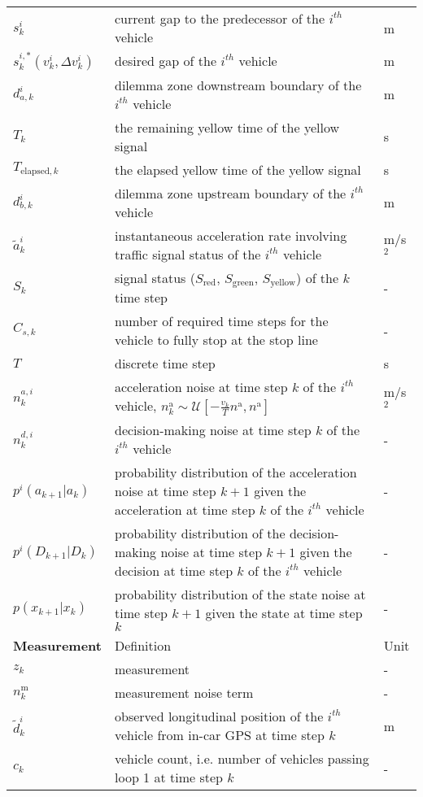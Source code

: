 \begin{longtable}{p{2.5cm}p{10cm}p{2.5cm}}
    $s_k^i$ & current gap to the predecessor of the $i^{th}$ vehicle & m \\
    $s_k^{i,*}(v_k^i, \Delta v_k^i)$ & desired gap of the $i^{th}$ vehicle & m \\
    $d_{a,k}^i$ & dilemma zone downstream boundary of the $i^{th}$ vehicle & m\\
    $T_k$ & the remaining yellow time of the yellow signal & s\\
    $T_{\text{elapsed},k}$ & the elapsed yellow time of the yellow signal & s\\
    $d_{b,k}^i$ & dilemma zone upstream boundary of the $i^{th}$ vehicle & m \\
    $\tilde a_k^i$  & instantaneous acceleration rate involving traffic signal status of the $i^{th}$ vehicle & m/s$^2$ \\
    $S_{k}$ & signal status ($S_{\text{red}}$, $S_{\text{green}}$, $S_{\text{yellow}}$) of the $k$ time step & - \\
    $C_{s,k}$ & number of required time steps for the vehicle to fully stop at the stop line & - \\
    $T$ & discrete time step & s \\
    $n_k^{a,i}$ & acceleration noise at time step $k$ of the $i^{th}$ vehicle, $n_k^\text{a} \sim \mathcal{U}[-\frac{v_k}{T}n^\text{a}, n^\text{a}]$ & m/s$^2$ \\
    $n_k^{d,i}$ & decision-making noise at time step $k$ of the $i^{th}$ vehicle & - \\
    $p^i(a_{k+1} | a_{k})$ & probability distribution of the acceleration noise at time step $k+1$ given the acceleration at time step $k$ of the $i^{th}$ vehicle & - \\
    $p^i(D_{k+1} | D_{k})$ & probability distribution of the decision-making noise at time step $k+1$ given the decision at time step $k$ of the $i^{th}$ vehicle & - \\
    $p(x_{k+1} | x_{k})$ & probability distribution of the state noise at time step $k+1$ given the state at time step $k$ & - \\
    \toprule
    \textbf{Measurement}  & Definition & Unit \\
    \midrule
    $z_k$ & measurement & - \\
    $n_k^\text{m}$  & measurement noise term& - \\
    $\tilde d_k^i$ & observed longitudinal position of the $i^{th}$ vehicle from in-car GPS at time step $k$ & m \\
    $c_k$ & vehicle count, i.e. number of vehicles passing loop 1 at time step $k$ & -\\

\end{longtable}
